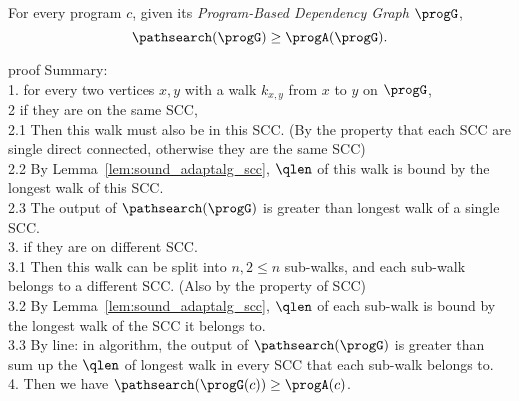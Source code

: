 \begin{thm}
  For every program $c$, given its \emph{Program-Based Dependency Graph} $\progG$,
   $$\pathsearch(\progG) \geq \progA(\progG).$$
\end{thm}
proof Summary:
\\
1. for every two vertices $x, y$ with a walk $k_{x,y}$ from $x$ to $y$ on $\progG$, 
\\
2 if they are on the same SCC, 
\\
2.1 Then this walk must also be in this SCC.
(By the property that each SCC are single direct connected, otherwise they are the same SCC)
\\
2.2 By Lemma~\ref{lem:sound_adaptalg_scc}, $\qlen$ of this walk is bound by the longest walk of this SCC.
\\
2.3 The output of $\pathsearch(\progG)$ is greater than longest walk of a single SCC.
\\
3. if they are on different SCC. 
\\
3.1 Then this walk can be split into $n, 2 \leq n$ sub-walks, and each sub-walk belongs to a different SCC. (Also by the property of SCC)
\\
3.2 By Lemma~\ref{lem:sound_adaptalg_scc}, $\qlen$ of each sub-walk is bound by the longest walk of the SCC it belongs to.
\\
3.3 By line: in algorithm, the output of $\pathsearch(\progG)$ is greater than sum up the $\qlen$ of longest walk in every SCC that each sub-walk belongs to.
\\
4. Then we have
$\pathsearch(\progG(c)) \geq \progA(c)$.
